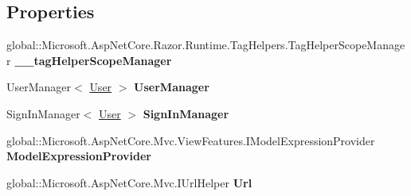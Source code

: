 \subsection*{Properties}
\begin{DoxyCompactItemize}
\item 
\mbox{\label{class_asp_net_core_1_1_views___shared_____login_partial_a013dccd73667fdfe9b4f60f029ee84aa}} 
global\+::\+Microsoft.\+Asp\+Net\+Core.\+Razor.\+Runtime.\+Tag\+Helpers.\+Tag\+Helper\+Scope\+Manager {\bfseries \+\_\+\+\_\+tag\+Helper\+Scope\+Manager}
\item 
User\+Manager$<$ \mbox{\hyperlink{class_projeto_e_s_w_1_1_models_1_1_user}{User}} $>$ {\bfseries User\+Manager}
\item 
\mbox{\label{class_asp_net_core_1_1_views___shared_____login_partial_ada2bd63f6725bd4df8bcefdd23c8c884}} 
Sign\+In\+Manager$<$ \mbox{\hyperlink{class_projeto_e_s_w_1_1_models_1_1_user}{User}} $>$ {\bfseries Sign\+In\+Manager}
\item 
\mbox{\label{class_asp_net_core_1_1_views___shared_____login_partial_a41f7e37386ebe5f3627eede67bd6fcc2}} 
global\+::\+Microsoft.\+Asp\+Net\+Core.\+Mvc.\+View\+Features.\+I\+Model\+Expression\+Provider {\bfseries Model\+Expression\+Provider}
\item 
\mbox{\label{class_asp_net_core_1_1_views___shared_____login_partial_aa7ace3c9d1c6c08a6530973e5e0fc870}} 
global\+::\+Microsoft.\+Asp\+Net\+Core.\+Mvc.\+I\+Url\+Helper {\bfseries Url}
\item 
\mbox{\label{class_asp_net_core_1_1_views___shared_____login_partial_a5b0f11c8443e3a1640f01d7c09c8cd3a}} 

\end{DoxyCompactItemize}
